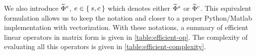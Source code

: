 We also introduce $\widetilde{\Phi}^e$, $e\in\Set{s,c}$ which denotes either $\widetilde{\Phi}^s$ or $\widetilde{\Phi}^c$. This equivalent formulation allows us to keep the notation  and closer to a proper Python/Matlab implementation with vectorization. With these notations, a summary of efficient linear operators in matrix form is given in \cref{table:efficient-op}. The complexity of evaluating all this operators is given in \cref{table:efficient-complexity}.
